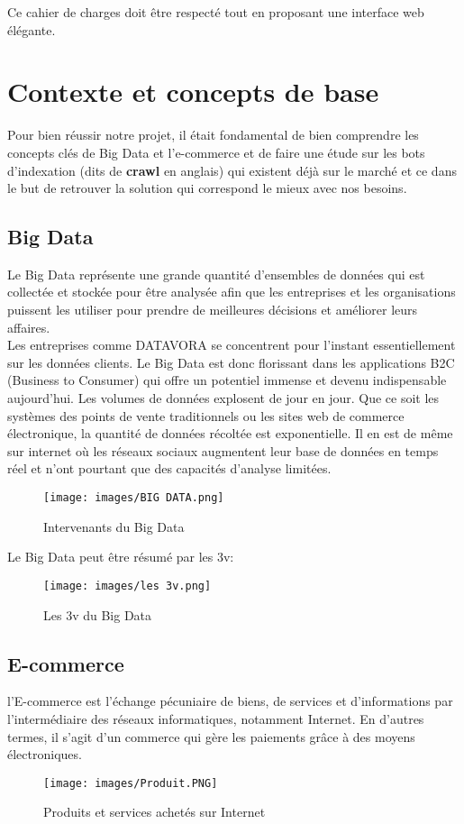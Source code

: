 Ce cahier de charges doit être respecté tout en proposant une interface web élégante.
\section{Contexte et concepts de base}
Pour bien réussir notre projet, il était fondamental de bien comprendre les concepts clés de Big Data et l’e-commerce et de faire une étude sur les bots d'indexation (dits de  \textbf{crawl} en anglais) qui existent déjà sur le marché et ce dans le but de retrouver la solution qui correspond le mieux avec nos besoins.

\subsection{Big Data} 
Le Big Data \textbf{\cite{bigdata}} représente une grande quantité d’ensembles de données qui est collectée et stockée pour être analysée afin que les entreprises et les organisations puissent les utiliser pour prendre de meilleures décisions et améliorer leurs affaires.\\ 
Les entreprises comme  DATAVORA se concentrent pour l’instant essentiellement sur les données clients. Le Big Data est donc florissant dans les applications B2C (Business to Consumer) qui offre un potentiel immense et devenu indispensable aujourd'hui. Les volumes de données explosent de jour en jour. Que ce soit les systèmes des points de vente traditionnels ou les sites web de commerce électronique, la quantité de données récoltée est exponentielle. Il en est de même sur internet où les réseaux sociaux augmentent leur base de données en temps réel et n’ont pourtant que des capacités d’analyse limitées.\\
\begin{figure}[H]
\centering
\texttt{[image: images/BIG DATA.png]}
\caption{Intervenants du Big Data \cite{bigdata1}}
\label{fig:Mod-Enseig}
\end{figure}
Le Big Data peut être résumé par les 3v:
\vspace{0.5cm}
\begin{figure}[H]
\centering
\texttt{[image: images/les 3v.png]}
\caption{Les 3v du Big Data \cite{3v}}
\label{fig:Mod-Enseig}
\end{figure}

\subsection{E-commerce }
l'E-commerce \textbf{\cite{e-commerce}} est l’échange pécuniaire de biens, de services et d’informations par l’intermédiaire des réseaux informatiques, notamment Internet. 
En d’autres termes, il s’agit d’un commerce qui gère les paiements grâce à des moyens électroniques. 
\begin{figure}[H]
    \centering
    \texttt{[image: images/Produit.PNG]}
    \caption{Produits et services achetés sur Internet \cite{produit}}
    \label{fig:Global}  
    \end{figure}
